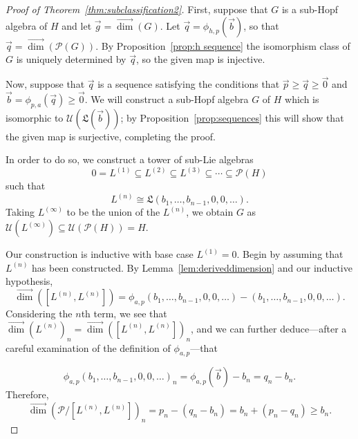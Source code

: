 \documentclass[11pt]{amsart}
\theoremstyle{definition}
\numberwithin{equation}{section}
\newcommand{\vecdim}{\overrightarrow{\dim}}
\begin{document}
\begin{proof}[Proof of Theorem~\ref{thm:subclassification2}]
First, suppose that $G$ is a sub-Hopf algebra of $H$ and let $\vec{g} = \vecdim(G)$.  Let $\vec{q} = \phi_{h, p}(\vec{b})$, so that $\vec{q} = \vecdim(\mathcal{P}(G))$.  By Proposition~\ref{prop:h sequence} the isomorphism class of $G$ is uniquely determined by $\vec{q}$, so the given map is injective.

Now, suppose that $\vec{q}$ is a sequence satisfying the conditions that $\vec{p} \ge \vec{q} \ge \vec{0}$ and $\vec{b} = \phi_{p, a}(\vec{q}) \ge \vec{0}$.  
We will construct a sub-Hopf algebra $G$ of $H$ which is isomorphic to $\mathcal{U}(\mathfrak{L}(\vec{b}))$; by Proposition~\ref{prop:sequences} this will show that the given map is surjective, completing the proof.  

In order to do so, we construct a tower of sub-Lie algebras 
\[
0 = L^{(1)} \subseteq L^{(2)} \subseteq L^{(3)} \subseteq \cdots \subseteq \mathcal{P}(H)
\]
such that 
\[
L^{(n)} \cong \mathfrak{L}(b_{1}, \ldots, b_{n-1}, 0, 0, \ldots).
\]
Taking $L^{(\infty)}$ to be the union of the $L^{(n)}$, we obtain $G$ as $\mathcal{U}(L^{(\infty)}) \subseteq \mathcal{U}(\mathcal{P}(H)) = H$.

Our construction is inductive with base case $L^{(1)} = 0$.  
Begin by assuming that $L^{(n)}$ has been constructed.  
By Lemma~\ref{lem:deriveddimension} and our inductive hypothesis,
\[
\vecdim([L^{(n)}, L^{(n)}])%
 = 
\phi_{a, p}(b_{1}, \ldots, b_{n-1}, 0, 0, \ldots) - (b_{1}, \ldots, b_{n-1}, 0, 0, \ldots).
\]
Considering the $n$th term, we see that $\vecdim(L^{(n)})_{n} = \vecdim([L^{(n)}, L^{(n)}])_{n}$, and we can further deduce---after a careful examination of the definition of $\phi_{a, p}$---that

\begin{equation}
\label{eq:inductivedimensionequality}
\phi_{a, p}(b_{1}, \ldots, b_{n-1}, 0, 0, \ldots)_{n}
=
\phi_{a, p}(\vec{b}) - b_{n}
=
q_{n} - b_{n}.
\end{equation}
Therefore,
\[
\vecdim\left( \mathcal{P} \big/ [L^{(n)}, L^{(n)}] \right)_{n}
= p_{n} - (q_{n} - b_{n})
= b_{n} + (p_{n} - q_{n})
\ge b_{n}.
\]


\end{proof}
\end{document}
